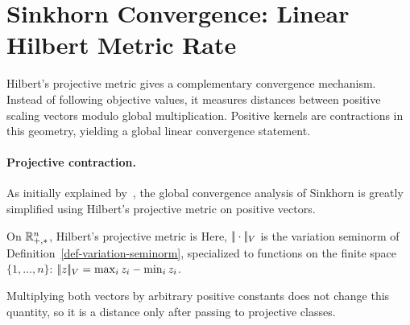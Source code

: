 
\section{Sinkhorn Convergence: Linear Hilbert Metric Rate}
\label{sec-sinkhorn-hilbert}

Hilbert's projective metric gives a complementary convergence mechanism. Instead of following objective values, it measures distances between positive scaling vectors modulo global multiplication. Positive kernels are contractions in this geometry, yielding a global linear convergence statement.

\paragraph{Projective contraction.}
As initially explained by~\cite{franklin1989scaling}, the global convergence analysis of Sinkhorn is greatly simplified using Hilbert's projective metric on positive vectors.

\begin{defn}\label{def-hilbert-metric}
	On $\mathbb{R}_{+,*}^n$, Hilbert's projective metric is
	Here, $|\!| \cdot |\!|_V$ is the variation seminorm of Definition~\ref{def-variation-seminorm}, specialized to functions on the finite space $\{1,\ldots,n\}$: $|\!| z |\!|_V=\max_i z_i-\min_i z_i$.
\end{defn}
Multiplying both vectors by arbitrary positive constants does not change this quantity, so it is a distance only after passing to projective classes.

